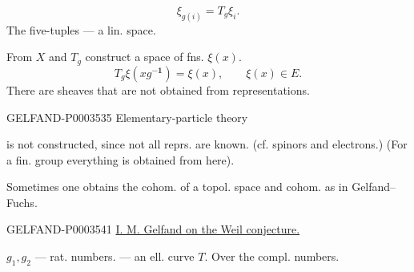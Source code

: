 \begin{equation*}\xi_{g (i)}=T_g\xi_i.\end{equation*}
The five-tuples --- a lin. space.
\begin{center}\end{center}
From $X$ and $T_g$ construct a space of fns. $\xi (x)$.
\begin{equation*}T_g\xi (xg^{\boldsymbol{-1}})=\xi (x),\qquad\xi (x)\in E.\end{equation*}
There are sheaves that are not obtained from representations.

\begin{GelfandAdjacentEvidence}{GELFAND-P000353}{5}
Elementary-particle theory
\end{GelfandAdjacentEvidence}

is not constructed, since not all reprs. are known.
(cf. spinors and electrons.)
(For a fin. group everything is obtained from here).

Sometimes one obtains the cohom. of a topol. space and cohom. as in Gelfand–Fuchs.


\begin{GelfandAdjacentEvidence}{GELFAND-P000354}{1}
\uline{I. M. Gelfand on the Weil conjecture.}



\end{GelfandAdjacentEvidence}

$g_1, g_2$ --- rat. numbers. --- an ell. curve $T$.
Over the compl. numbers.

